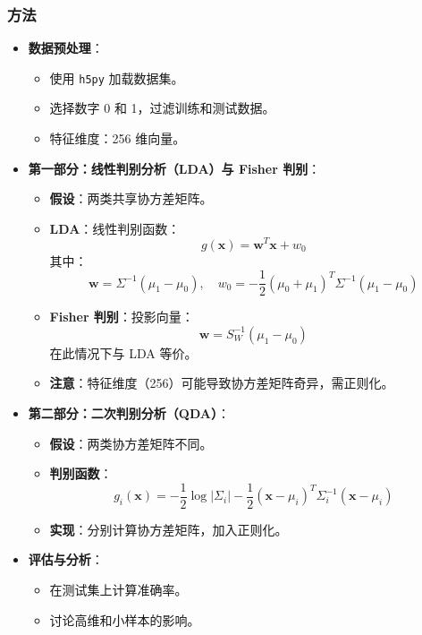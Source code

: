 \documentclass[UTF8]{report}
\theoremstyle{MyLineTheoremStyle} %
\theoremstyle{MyBlockTheoremStyle} %
\theoremstyle{MySubsubsectionStyle} %
\begin{document}
\subsubsection{方法}
\begin{itemize}
    \item \textbf{数据预处理}：
    \begin{itemize}
        \item 使用 \texttt{h5py} 加载数据集。
        \item 选择数字 0 和 1，过滤训练和测试数据。
        \item 特征维度：256 维向量。
    \end{itemize}
    \item \textbf{第一部分：线性判别分析（LDA）与 Fisher 判别}：
    \begin{itemize}
        \item \textbf{假设}：两类共享协方差矩阵。
        \item \textbf{LDA}：线性判别函数：
        \[
        g(\mathbf{x}) = \mathbf{w}^T \mathbf{x} + w_0
        \]
        其中：
        \[
        \mathbf{w} = \Sigma^{-1} (\mu_1 - \mu_0), \quad w_0 = -\frac{1}{2} (\mu_0 + \mu_1)^T \Sigma^{-1} (\mu_1 - \mu_0)
        \]
        \item \textbf{Fisher 判别}：投影向量：
        \[
        \mathbf{w} = S_W^{-1} (\mu_1 - \mu_0)
        \]
        在此情况下与 LDA 等价。
        \item \textbf{注意}：特征维度（256）可能导致协方差矩阵奇异，需正则化。
    \end{itemize}
    \item \textbf{第二部分：二次判别分析（QDA）}：
    \begin{itemize}
        \item \textbf{假设}：两类协方差矩阵不同。
        \item \textbf{判别函数}：
        \[
        g_i(\mathbf{x}) = -\frac{1}{2} \log |\Sigma_i| - \frac{1}{2} (\mathbf{x} - \mu_i)^T \Sigma_i^{-1} (\mathbf{x} - \mu_i)
        \]
        \item \textbf{实现}：分别计算协方差矩阵，加入正则化。
    \end{itemize}
    \item \textbf{评估与分析}：
    \begin{itemize}
        \item 在测试集上计算准确率。
        \item 讨论高维和小样本的影响。
    \end{itemize}
\end{itemize}
\end{document}
